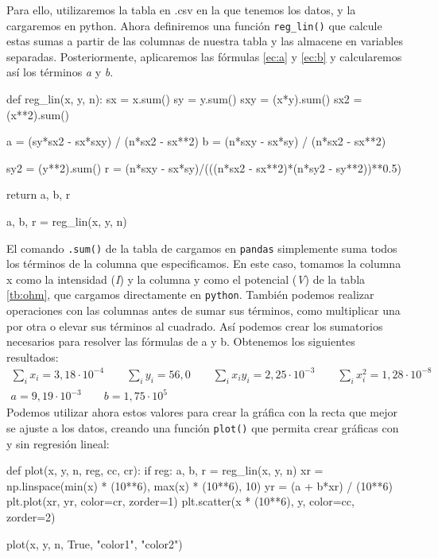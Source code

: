 \documentclass[12pt, a4paper, titlepage]{article}
\newcommand{\code}[1]{\texttt{#1}} %
\begin{document}
  Para ello, utilizaremos la tabla en .csv en la que tenemos los datos, y la cargaremos en python. Ahora definiremos una función \code{reg\_lin()} que calcule estas sumas a partir de las columnas de nuestra tabla y las almacene en variables separadas. Posteriormente, aplicaremos las fórmulas \ref{ec:a} y \ref{ec:b} y calcularemos así los términos \textit{a} y \textit{b}.

  \begin{python}
    def reg_lin(x, y, n):
        sx = x.sum()
        sy = y.sum()
        sxy = (x*y).sum()
        sx2 = (x**2).sum()

        a = (sy*sx2 - sx*sxy) / (n*sx2 - sx**2)
        b = (n*sxy - sx*sy) / (n*sx2 - sx**2)

        sy2 = (y**2).sum()
        r = (n*sxy - sx*sy)/(((n*sx2 - sx**2)*(n*sy2 - sy**2))**0.5)

        return a, b, r

    a, b, r = reg_lin(x, y, n)
  \end{python}

  El comando \code{.sum()} de la tabla de cargamos en \code{pandas} simplemente suma todos los términos de la columna que especificamos. En este caso, tomamos la columna x como la intensidad (\textit{I}) y la columna y como el potencial (\textit{V}) de la tabla \ref{tb:ohm}, que cargamos directamente en \code{python}. También podemos realizar operaciones con las columnas antes de sumar sus términos, como multiplicar una por otra o elevar sus términos al cuadrado. Así podemos crear los sumatorios necesarios para resolver las fórmulas de a y b. Obtenemos los siguientes resultados:
  \begin{gather}
    \sum_i x_i = 3,18\cdot10^{-4} \nonumber \qquad \sum_i y_i = 56,0 \nonumber \qquad \sum_i x_iy_i = 2,25\cdot10^{-3} \nonumber \qquad \sum_i x_i^2 = 1,28\cdot10^{-8} \nonumber \\
    a = 9,19\cdot10^{-3} \nonumber \qquad b = 1,75 \cdot 10^5 \label{v:ohm}
  \end{gather}
  Podemos utilizar ahora estos valores para crear la gráfica con la recta que mejor se ajuste a los datos, creando una función \code{plot()} que permita crear gráficas con y sin regresión lineal:

  \begin{python}
    def plot(x, y, n, reg, cc, cr):
      if reg:
          a, b, r = reg_lin(x, y, n)
          xr = np.linspace(min(x) * (10**6), max(x) * (10**6), 10)
          yr = (a + b*xr) / (10**6)
          plt.plot(xr, yr, color=cr, zorder=1)
      plt.scatter(x * (10**6), y, color=cc, zorder=2)

    plot(x, y, n, True, "color1", "color2")
  \end{python}
\end{document}
